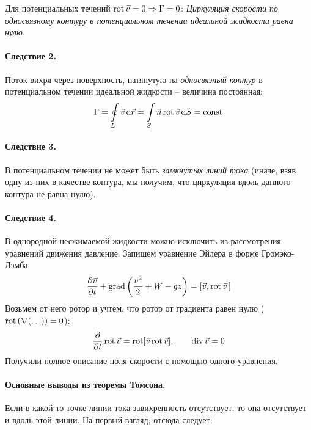 Для потенциальных течений $ \operatorname{rot} \vec{v} = 0 \Rightarrow \Gamma = 0$: \textit{Циркуляция скорости по {односвязному контуру} в потенциальном течении идеальной жидкости равна нулю.}

\paragraph{Следствие 2.} 	Поток вихря через поверхность, натянутую на  \textit{односвязный контур} в потенциальном течении идеальной жидкости -- величина постоянная:
	\begin{align*}
	\Gamma = \oint \limits_ { L } \vec{v} \dd{\vec{r}} = \int \limits_ { S } \vec { n }  \operatorname{rot} \vec{v}\dd{S} = \mathrm{const}\,
	\end{align*}


\paragraph{Следствие 3.} В потенциальном течении не может быть \textit{замкнутых линий тока} (иначе, взяв одну из них в качестве контура, мы получим, что циркуляция вдоль данного контура не равна нулю).

\paragraph{Следствие 4.} В однородной несжимаемой жидкости можно исключить из рассмотрения уравнений движения давление.  Запишем уравнение Эйлера в форме Громэко-Лэмба
\begin{equation}
	\frac { \partial \vec{v} } { \partial t } +\operatorname{grad} \left( \frac { v ^ { 2 } } { 2 } + W - g z \right) = [ \vec{v} , \operatorname{rot} \vec{v}\,]
\end{equation}
Возьмем от него ротор и учтем, что ротор от градиента равен нулю ($\operatorname{rot}\qty(\nabla \qty(\ldots))= 0 $):
\begin{align*}
{ \pdv{t} \operatorname{rot}\vec{v} = \operatorname{rot}[ \vec{v} \operatorname{rot}\vec{v} ] }, \qquad
{\operatorname{div}\vec{v} = 0 }
\end{align*}
Получили полное описание поля скорости с помощью одного уравнения.


\paragraph{Основные выводы из теоремы Томсона.} Если в какой-то точке линии тока завихренность отсутствует, то она отсутствует и вдоль этой линии. На первый взгляд, отсюда следует:

